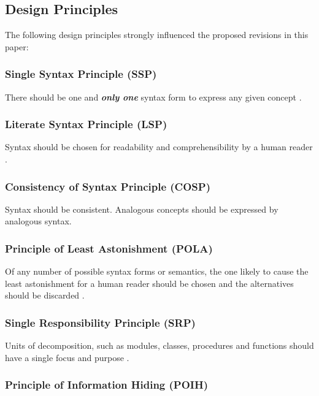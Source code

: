 \documentclass[10pt,a4paper,leqno,fleqn]{article}
\renewcommand{\emph}[1]{\textbf{\textit{#1}}}
\begin{document}
\subsection{Design Principles}
\label{design-principles}

The following design principles strongly influenced the proposed revisions in
this paper:

\subsubsection{Single Syntax Principle (SSP)}
\label{SSP}

There should be one and \emph{only one} syntax form to express any given
concept \cite{Dijkstra78}.

\subsubsection{Literate Syntax Principle (LSP)}
\label{LSP}

Syntax should be chosen for readability and comprehensibility by a human
reader \cite{Knuth84}.

\subsubsection{Consistency of Syntax Principle (COSP)}
\label{COSP}

Syntax should be consistent. Analogous concepts should be expressed by
analogous syntax.

\subsubsection{Principle of Least Astonishment (POLA)}
\label{POLA}

Of any number of possible syntax forms or semantics, the one likely to cause
the least astonishment for a human reader should be chosen and the
alternatives should be discarded \cite{Geoffrey87}.

\subsubsection{Single Responsibility Principle (SRP)}
\label{SRP}

Units of decomposition, such as modules, classes, procedures and functions
should have a single focus and purpose \cite{Martin09}.

\subsubsection{Principle of Information Hiding (POIH)}
\label{POIH}
\end{document}

